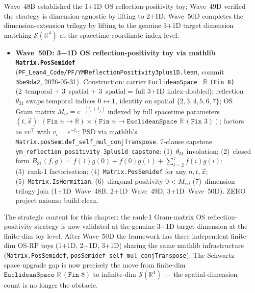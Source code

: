 \begin{remark}\label{rem:ym-wave50d-lean}
Wave~48B established the 1+1D OS reflection-positivity toy; Wave~49D verified the strategy is dimension-agnostic by lifting to 2+1D. Wave~50D completes the dimension-extension trilogy by lifting to the genuine 3+1D target dimension matching $\mathcal{S}(\mathbb{R}^4)$ at the spacetime-coordinate index level:
\begin{itemize}
  \item \textbf{Wave~50D: 3+1D OS reflection-positivity toy via mathlib \texttt{Matrix.PosSemidef}} (\texttt{PF\_Lean4\_Code/PF/YMReflectionPositivity3plus1D.lean}, commit \texttt{3be9da2}, 2026-05-31). Construction: carrier \texttt{EuclideanSpace } $\mathbb{R}$ \texttt{(Fin 8)} (2~temporal $+$ 3~spatial $+$ 3~spatial = full 3+1D index-doubled); reflection $\theta_{31}$ swaps temporal indices $0 \leftrightarrow 1$, identity on spatial $\{2, 3, 4, 5, 6, 7\}$; OS Gram matrix $M_{ij} = e^{-(t_i + t_j)}$ indexed by full spacetime parameters $(t, \vec{x}) : (\texttt{Fin } n \to \mathbb{R}) \times (\texttt{Fin } n \to \texttt{EuclideanSpace } \mathbb{R}\,(\texttt{Fin } 3))$; factors as $v v^\top$ with $v_i = e^{-t_i}$; PSD via mathlib's \texttt{Matrix.posSemidef\_self\_mul\_conjTranspose}. 7-clause capstone \texttt{ym\_reflection\_positivity\_3plus1d\_capstone}: (1)~$\theta_{31}$ involution; (2)~closed form $B_{31}(f, g) = f(1) g(0) + f(0) g(1) + \sum_{i=2}^{7} f(i) g(i)$; (3)~rank-1 factorisation; (4)~\texttt{Matrix.PosSemidef} for any $n, t, \vec{x}$; (5)~\texttt{Matrix.IsHermitian}; (6)~diagonal positivity $0 < M_{ii}$; (7)~dimension-trilogy join (1+1D~Wave~48B, 2+1D~Wave~49D, 3+1D~Wave~50D). ZERO project axioms; build clean.
\end{itemize}
The strategic content for this chapter: the rank-1 Gram-matrix OS reflection-positivity strategy is now validated at the genuine 3+1D target dimension at the finite-dim toy level. After Wave~50D the framework has three independent finite-dim OS-RP toys (1+1D, 2+1D, 3+1D) sharing the same mathlib infrastructure (\texttt{Matrix.PosSemidef}, \texttt{posSemidef\_self\_mul\_conjTranspose}). The Schwartz-space upgrade gap is now precisely the move from finite-dim $\texttt{EuclideanSpace } \mathbb{R}\,(\texttt{Fin } 8)$ to infinite-dim $\mathcal{S}(\mathbb{R}^4)$ --- the spatial-dimension count is no longer the obstacle.


\end{remark}
